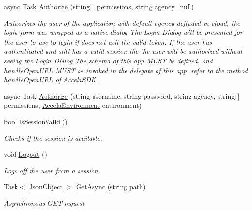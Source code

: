 \begin{DoxyCompactItemize}
\item 
async Task \hyperlink{class_accela_1_1_windows_store_s_d_k_1_1_accela_s_d_k_abf56a89a2e02c8eaac6112238750ada4}{Authorize} (string\mbox{[}$\,$\mbox{]} permissions, string agency=null)
\begin{DoxyCompactList}\small\item\em Authorizes the user of the application with default agency definded in cloud, the login form was wrapped as a native dialog The Login Dialog will be presented for the user to use to login if does not exit the valid token. If the user has authenticated and still has a valid session the the user will be authorized without seeing the Login Dialog The schema of this app M\+U\+S\+T be defined, and handle\+Open\+U\+R\+L M\+U\+S\+T be invoked in the delegate of this app. refer to the method handle\+Open\+U\+R\+L of \hyperlink{class_accela_1_1_windows_store_s_d_k_1_1_accela_s_d_k}{Accela\+S\+D\+K}. \end{DoxyCompactList}\item 
async Task \hyperlink{class_accela_1_1_windows_store_s_d_k_1_1_accela_s_d_k_a1f6933990dbc6be44d5c64cafb132ad4}{Authorize} (string username, string password, string agency, string\mbox{[}$\,$\mbox{]} permissions, \hyperlink{namespace_accela_1_1_windows_store_s_d_k_a47577e6208bf1ae5cf34c33d54a3458c}{Accela\+Environment} environment)
\item 
bool \hyperlink{class_accela_1_1_windows_store_s_d_k_1_1_accela_s_d_k_ab6fe0d04720f94233abd4a5b36ca6160}{Is\+Session\+Valid} ()
\begin{DoxyCompactList}\small\item\em Checks if the session is available. \end{DoxyCompactList}\item 
void \hyperlink{class_accela_1_1_windows_store_s_d_k_1_1_accela_s_d_k_adef5f75f233b18fa58ebdfc17cac7202}{Logout} ()
\begin{DoxyCompactList}\small\item\em Logs off the user from a session. \end{DoxyCompactList}\item 
Task$<$ \hyperlink{class_accela_1_1_windows_store_s_d_k_1_1_json_object}{Json\+Object} $>$ \hyperlink{class_accela_1_1_windows_store_s_d_k_1_1_accela_s_d_k_acd3bbc8de0b9ecc370fb751a4b6c74ec}{Get\+Async} (string path)
\begin{DoxyCompactList}\small\item\em Asynchronous G\+E\+T request \end{DoxyCompactList}\item 

\end{DoxyCompactItemize}
